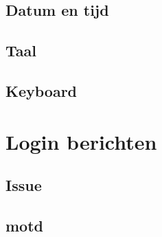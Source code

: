 \documentclass[a4paper,12pt,twoside,openright,titlepage]{book}
\begin{document}
\subsection{Datum en tijd}

\subsection{Taal}

\subsection{Keyboard}


\section{Login berichten}
\subsection{Issue}

\subsection{motd}


\printindex
\end{document}

